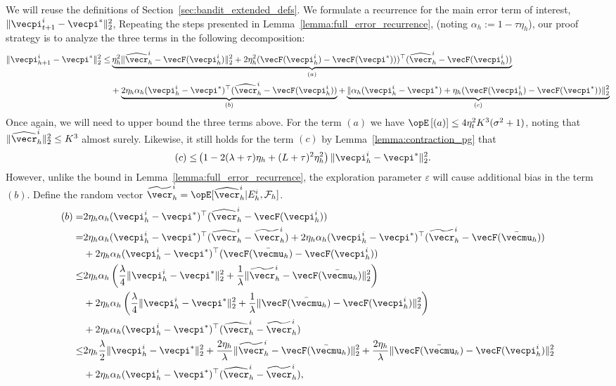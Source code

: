 We will reuse the definitions of Section~\ref{sec:bandit_extended_defs}.
We formulate a recurrence for the main error term of interest, $\| \vecpi_{t+1}^i - \vecpi^*\|_2^2$,
Repeating the steps presented in Lemma~\ref{lemma:full_error_recurrence}, (noting $\alpha_h := 1 - \tau\eta_h$), our proof strategy is to analyze the three terms in the following decomposition:
\begin{align*}
    \| \vecpi_{h+1}^i - \vecpi^*\|_2^2  
    \leq & \underbrace{\eta_h^2\| \widehat{\vecr}_h^i - \vecF(\vecpi_h^i) \|_2^2 + 2\eta_h^2 (\vecF(\vecpi_h^i) - \vecF(\vecpi^*)))^\top (\widehat{\vecr}_h^i - \vecF(\vecpi_h^i))}_{(a)} \\
     &+ \underbrace{2\eta_h\alpha_h (\vecpi_h^i - \vecpi^*)^\top (\widehat{\vecr}_h^i - \vecF(\vecpi_h^i))}_{(b)} + \underbrace{\|\alpha_h (\vecpi_h^i - \vecpi^*) + \eta_h (\vecF(\vecpi_h^i) - \vecF(\vecpi^*))\|_2^2 }_{(c)}
\end{align*}
Once again, we will need to upper bound the three terms above.
For the term $(a)$ we have $\Exop\left[ (a)\right] \leq 4\eta_t^2 K^3(\sigma^2 + 1)$, noting that $\|\widehat{\vecr}_h^i\|_2^2 \leq K^3$ almost surely.
Likewise, it still holds for the term $(c)$ by Lemma~\ref{lemma:contraction_pg} that
\begin{align*}
    (c) 
        \leq & \left(1 - 2 (\lambda + \tau) \eta_h + (L + \tau)^2 \eta_h^2\right) \| \vecpi_h^i - \vecpi^* \|_2^2.
\end{align*}
However, unlike the bound in Lemma~\ref{lemma:full_error_recurrence}, the exploration parameter $\varepsilon$ will cause additional bias in the term $(b)$.
Define the random vector $\widetilde{\vecr}_h^i = \Exop[ \widehat{\vecr}_h^i | E_h^i, \mathcal{F}_h]$.
\begin{align*}
(b) = & 2\eta_h\alpha_h (\vecpi_h^i - \vecpi^*)^\top (\widehat{\vecr}_h^i - \vecF(\vecpi_h^i)) \\
 = & 2\eta_h\alpha_h (\vecpi_h^i - \vecpi^*)^\top (\widehat{\vecr}_h^i - \widetilde{\vecr}_h^i) + 2\eta_h\alpha_h (\vecpi_h^i - \vecpi^*)^\top (\widetilde{\vecr}_h^i - \vecF(\bar{\vecmu}_h)) \\
    & + 2\eta_h\alpha_h (\vecpi_h^i - \vecpi^*)^\top (\vecF(\bar{\vecmu}_h) - \vecF(\vecpi_h^i)) \\
\leq &2\eta_h\alpha_h \left( \frac{\lambda}{4} \|\vecpi_h^i - \vecpi^* \|_2^2 + \frac{1}{\lambda} \|\widetilde{\vecr}_h^i - \vecF(\bar{\vecmu}_h)\|_2^2\right) \\
    & + 2\eta_h\alpha_h \left(\frac{\lambda}{4} \|\vecpi_h^i - \vecpi^* \|_2^2 + \frac{1}{\lambda} \|\vecF(\bar{\vecmu}_h) - \vecF(\vecpi_h^i)\|_2^2 \right) \\
    &+ 2\eta_h\alpha_h (\vecpi_h^i - \vecpi^*)^\top (\widehat{\vecr}_h^i - \widetilde{\vecr}_h^i) \\
\leq & 2 \eta_h \frac{\lambda}{2} \|\vecpi_h^i - \vecpi^* \|_2^2 + \frac{2\eta_h}{\lambda}\|\widetilde{\vecr}_h^i - \vecF(\bar{\vecmu}_h)\|_2^2 + \frac{2\eta_h}{\lambda} \|\vecF(\bar{\vecmu}_h) - \vecF(\vecpi_h^i)\|_2^2 \\
    &+2\eta_h\alpha_h (\vecpi_h^i - \vecpi^*)^\top (\widehat{\vecr}_h^i - \widetilde{\vecr}_h^i),
\end{align*}
